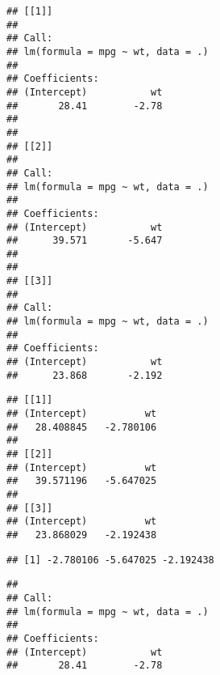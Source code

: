 \documentclass[
]{book}
\newenvironment{Shaded}{\begin{snugshade}}{\end{snugshade}}
\newcommand{\DecValTok}[1]{\textcolor[rgb]{0.00,0.00,0.81}{#1}}
\newcommand{\NormalTok}[1]{#1}
\newcommand{\SpecialCharTok}[1]{\textcolor[rgb]{0.00,0.00,0.00}{#1}}
\begin{document}
\begin{Shaded}
\end{Shaded}

\begin{verbatim}
## [[1]]
## 
## Call:
## lm(formula = mpg ~ wt, data = .)
## 
## Coefficients:
## (Intercept)           wt  
##       28.41        -2.78  
## 
## 
## [[2]]
## 
## Call:
## lm(formula = mpg ~ wt, data = .)
## 
## Coefficients:
## (Intercept)           wt  
##      39.571       -5.647  
## 
## 
## [[3]]
## 
## Call:
## lm(formula = mpg ~ wt, data = .)
## 
## Coefficients:
## (Intercept)           wt  
##      23.868       -2.192
\end{verbatim}

\begin{Shaded}
\end{Shaded}

\begin{verbatim}
## [[1]]
## (Intercept)          wt 
##   28.408845   -2.780106 
## 
## [[2]]
## (Intercept)          wt 
##   39.571196   -5.647025 
## 
## [[3]]
## (Intercept)          wt 
##   23.868029   -2.192438
\end{verbatim}

\begin{Shaded}
\end{Shaded}

\begin{verbatim}
## [1] -2.780106 -5.647025 -2.192438
\end{verbatim}

\begin{Shaded}
\end{Shaded}

\begin{verbatim}
## 
## Call:
## lm(formula = mpg ~ wt, data = .)
## 
## Coefficients:
## (Intercept)           wt  
##       28.41        -2.78
\end{verbatim}
\end{document}
